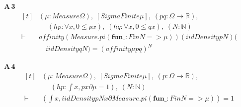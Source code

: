 \noindent\textbf{A\,3}\quad{}
{\footnotesize\[ \begin{aligned}[t]
&(\mu : \mathit{Measure} \Omega ),\; [\mathit{SigmaFinite} \mu ],\; (\mathit{p} \mathit{q} : \Omega \to \mathbb{R} ),\\
&\quad \; (\mathit{hp} : \forall \mathit{x}, 0 \leq \mathit{p} \mathit{x}),\; (\mathit{hq} : \forall \mathit{x}, 0 \leq \mathit{q} \mathit{x}),\; (\mathit{N} : \mathbb{N} )\\
\vdash\;&\mathit{affinity} (\mathit{Measure}.\mathit{pi} (\mathbf{fun} \mathit{\_} : \mathit{Fin} \mathit{N} => \mu )) (\mathit{iidDensity} \mathit{p} \mathit{N}) (\\
&\quad \mathit{iidDensity} \mathit{q} \mathit{N}) = (\mathit{affinity} \mu \mathit{p} \mathit{q})^{\mathit{N}}
\end{aligned} \]}

\noindent\textbf{A\,4}\quad{}
{\footnotesize\[ \begin{aligned}[t]
&(\mu : \mathit{Measure} \Omega ),\; [\mathit{SigmaFinite} \mu ],\; (\mathit{p} : \Omega \to \mathbb{R} ),\\
&\quad \; (\mathit{hp} : \int \mathit{x}, \mathit{p} \mathit{x} ∂\mu = 1),\; (\mathit{N} : \mathbb{N} )\\
\vdash\;&(\int \mathit{x}, \mathit{iidDensity} \mathit{p} \mathit{N} \mathit{x} ∂\mathit{Measure}.\mathit{pi} (\mathbf{fun} \mathit{\_} : \mathit{Fin} \mathit{N} => \mu )) = 1
\end{aligned} \]}

